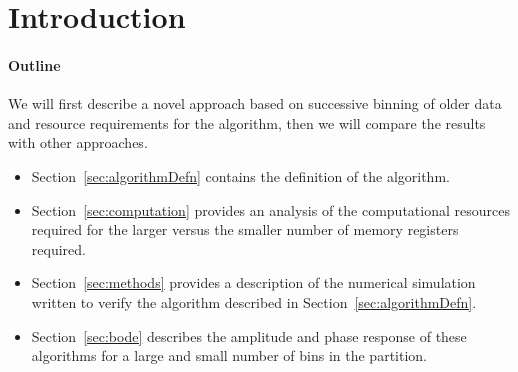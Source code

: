 \documentclass[preprint,12pt]{elsarticle}
\begin{document}



\section{Introduction}\label{sec:intro}
\setcounter{section}{1}
\setcounter{equation}{0}



\paragraph{Outline\\}
We will first describe a novel approach based on successive 
binning of older data and resource requirements for the 
algorithm, then we will compare the results with other
approaches.


\begin{itemize} 
\item Section~\ref{sec:algorithmDefn} contains the definition of
the algorithm. 
\item  Section~\ref{sec:computation} provides an analysis of the
  computational resources required for the larger versus the smaller
  number of memory registers required.
\item Section~\ref{sec:methods} provides a description of the
  numerical simulation written to verify the algorithm described in
  Section~\ref{sec:algorithmDefn}.
\item Section~\ref{sec:bode} describes the amplitude and phase response
  of these algorithms for a large and small number of bins in the
  partition.
\end{itemize}
\end{document}

